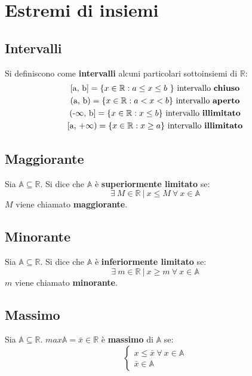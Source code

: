 \chapter{Estremi di insiemi}
\section{Intervalli}
Si definiscono come \textbf{intervalli} alcuni particolari sottoinsiemi di $\mathbb{R}$:
\begin{equation}
\begin{gathered}
$[a, b$] = \{x\in\mathbb{R}: a\le x\le b\ \} \text{ intervallo \textbf{chiuso}}\\
$(a, b$) = \{x\in\mathbb{R}: a < x < b\} \text{ intervallo \textbf{aperto}}\\
$(-$\infty$, b$] = \{x\in\mathbb{R}: x\le b\} \text{ intervallo \textbf{illimitato}}\\
$[a, +$\infty$$) = \{x\in\mathbb{R}: x\ge a\} \text{ intervallo \textbf{illimitato}}\\
\end{gathered}
\end{equation}
\section{Maggiorante}
Sia $\mathbb{A} \subseteq \mathbb{R}$. Si dice che $\mathbb{A}$ è \textbf{superiormente limitato} se:
\begin{equation}
\exists\ M \in \mathbb{R}\ |\ x \leq M\ \forall\ x \in \mathbb{A}
\end{equation}
$M$ viene chiamato \textbf{maggiorante}.
\section{Minorante}
Sia $\mathbb{A} \subseteq \mathbb{R}$. Si dice che $\mathbb{A}$ è \textbf{inferiormente limitato} se:
\begin{equation}
\exists\ m \in \mathbb{R}\ |\ x \geq m\ \forall\ x \in \mathbb{A}
\end{equation}
$m$ viene chiamato \textbf{minorante}.
\section{Massimo}
Sia $\mathbb{A} \subseteq \mathbb{R}$. $max\mathbb{A}=\bar{x} \in \mathbb{R}$ è \textbf{massimo} di $\mathbb{A}$ se:
\begin{equation}
\begin{cases}
x \leq \bar{x}\ \forall\ x \in \mathbb{A}\\
\bar{x} \in \mathbb{A}
\end{cases}
\end{equation}
